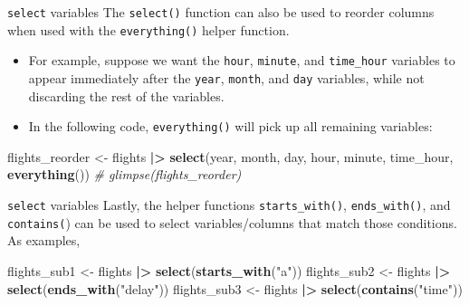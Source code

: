 \documentclass[
  ignorenonframetext,
]{beamer}
\newenvironment{Shaded}{\begin{snugshade}}{\end{snugshade}}
\newcommand{\CommentTok}[1]{\textcolor[rgb]{0.56,0.35,0.01}{\textit{#1}}}
\newcommand{\FunctionTok}[1]{\textcolor[rgb]{0.13,0.29,0.53}{\textbf{#1}}}
\newcommand{\NormalTok}[1]{#1}
\newcommand{\OtherTok}[1]{\textcolor[rgb]{0.56,0.35,0.01}{#1}}
\newcommand{\SpecialCharTok}[1]{\textcolor[rgb]{0.81,0.36,0.00}{\textbf{#1}}}
\newcommand{\StringTok}[1]{\textcolor[rgb]{0.31,0.60,0.02}{#1}}
\begin{document}
\begin{frame}[fragile]{\texttt{select} variables}
\protect\hypertarget{select-variables-3}{}
The \texttt{select()} function can also be used to reorder columns when
used with the \texttt{everything()} helper function.

\begin{itemize}
\item
  For example, suppose we want the \texttt{hour}, \texttt{minute}, and
  \texttt{time\_hour} variables to appear immediately after the
  \texttt{year}, \texttt{month}, and \texttt{day} variables, while not
  discarding the rest of the variables.
\item
  In the following code, \texttt{everything()} will pick up all
  remaining variables:
\end{itemize}

\normalsize

\begin{Shaded}
\begin{Highlighting}[]
\NormalTok{flights\_reorder }\OtherTok{\textless{}{-}}\NormalTok{ flights }\SpecialCharTok{|\textgreater{}} 
  \FunctionTok{select}\NormalTok{(year, month, day, hour, minute, time\_hour, }
         \FunctionTok{everything}\NormalTok{())}
\CommentTok{\# glimpse(flights\_reorder)}
\end{Highlighting}
\end{Shaded}

\normalsize
\end{frame}

\begin{frame}[fragile]{\texttt{select} variables}
\protect\hypertarget{select-variables-4}{}
Lastly, the helper functions \texttt{starts\_with()},
\texttt{ends\_with()}, and \texttt{contains(}) can be used to select
variables/columns that match those conditions. As examples,

\normalsize

\begin{Shaded}
\begin{Highlighting}[]
\NormalTok{flights\_sub1 }\OtherTok{\textless{}{-}}\NormalTok{ flights }\SpecialCharTok{|\textgreater{}} \FunctionTok{select}\NormalTok{(}\FunctionTok{starts\_with}\NormalTok{(}\StringTok{"a"}\NormalTok{))}
\NormalTok{flights\_sub2 }\OtherTok{\textless{}{-}}\NormalTok{ flights }\SpecialCharTok{|\textgreater{}} \FunctionTok{select}\NormalTok{(}\FunctionTok{ends\_with}\NormalTok{(}\StringTok{"delay"}\NormalTok{))}
\NormalTok{flights\_sub3 }\OtherTok{\textless{}{-}}\NormalTok{ flights }\SpecialCharTok{|\textgreater{}} \FunctionTok{select}\NormalTok{(}\FunctionTok{contains}\NormalTok{(}\StringTok{"time"}\NormalTok{))}
\end{Highlighting}
\end{Shaded}

\normalsize
\end{frame}
\end{document}
